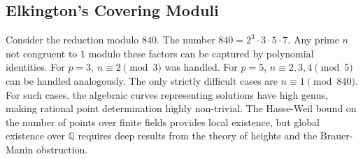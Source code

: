 \documentclass[12pt, a4paper]{article}
\begin{document}
\subsection{Elkington's Covering Moduli}
Consider the reduction modulo $840$. The number $840 = 2^3 \cdot 3 \cdot 5 \cdot 7$.
Any prime $n$ not congruent to $1$ modulo these factors can be captured by polynomial identities.
For $p=3$, $n \equiv 2 \pmod 3$ was handled.
For $p=5$, $n \equiv 2, 3, 4 \pmod 5$ can be handled analogously.
The only strictly difficult cases are $n \equiv 1 \pmod{840}$.
For such cases, the algebraic curves representing solutions have high genus, making rational point determination highly non-trivial. The Hasse-Weil bound on the number of points over finite fields provides local existence, but global existence over $\mathbb{Q}$ requires deep results from the theory of heights and the Brauer-Manin obstruction.

\newpage
\end{document}
